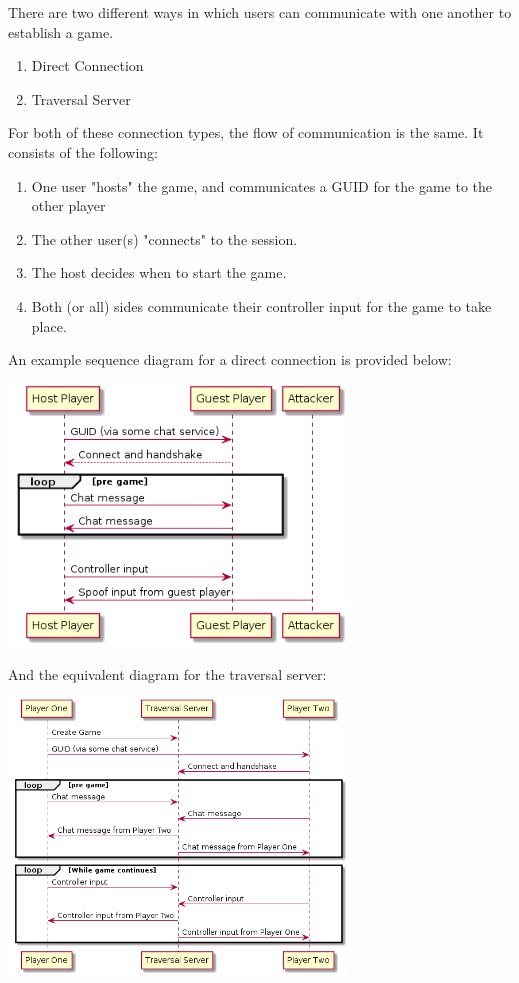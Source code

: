 \documentclass[conference]{IEEEtran}
\begin{document}
There are two different ways in which users can communicate with one another to establish a game.
\vspace{0.5cm}
\begin{enumerate}  
\item Direct Connection
\item Traversal Server
\end{enumerate}
\vspace{0.5cm}
For both of these connection types, the flow of communication is the same. It consists of the following:

\begin{enumerate}  
\item One user "hosts" the game, and communicates a GUID for the game to the other player
\item The other user(s) "connects" to the session.
\item The host decides when to start the game.
\item Both (or all) sides communicate their controller input for the game to take place.
\end{enumerate}
\vspace{0.cm}

An example sequence diagram for a direct connection is provided below:
\begin{center}
\includegraphics[width=9cm]{Figures/Basic_Sequence}
\end{center}
\vspace{0.3cm}
And the equivalent diagram for the traversal server:
\begin{center}
\includegraphics[width=9cm]{Figures/Sequence_Traversal}
\end{center}
\vspace{0.3cm}
\end{document}
